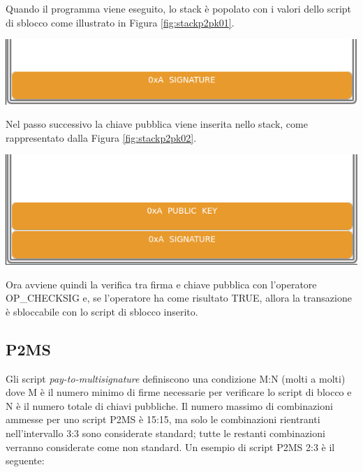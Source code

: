 Quando il programma viene eseguito, lo stack è popolato con i valori dello script di sblocco come illustrato in Figura \ref{fig:stackp2pk01}.

{\centering
\vspace{15pt}
\includegraphics[scale=0.35]{images/script/p2pk/1.png}
\vspace{10pt}
\par}

Nel passo successivo la chiave pubblica viene inserita nello stack, come rappresentato dalla Figura \ref{fig:stackp2pk02}.

{\centering
\vspace{15pt}
\includegraphics[scale=0.35]{images/script/p2pk/2.png}
\vspace{10pt}
\par}

Ora avviene quindi la verifica tra firma e chiave pubblica con l’operatore OP\_CHECKSIG e, se  l’operatore ha come risultato TRUE, allora la transazione è sbloccabile con lo script di sblocco inserito.

\subsection{P2MS}
\label{sec:p2msbitcoin}
Gli script {\it pay-to-multisignature} definiscono una condizione M:N (molti a molti) dove M è il numero minimo di firme necessarie per verificare lo script di blocco e N è il numero totale di chiavi pubbliche.
Il numero massimo di combinazioni ammesse per uno script P2MS è 15:15, ma solo le combinazioni rientranti nell’intervallo 3:3 sono considerate standard; tutte le restanti combinazioni verranno considerate come non standard.
Un esempio di script P2MS 2:3 è il seguente:

